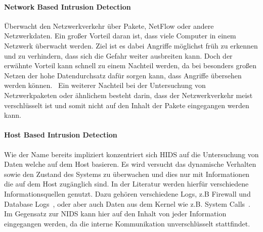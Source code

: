             \paragraph{Network Based Intrusion Detection}
                Überwacht den Netzwerkverkehr über Pakete, NetFlow oder andere Netzwerkdaten.
                Ein großer Vorteil daran ist, dass viele Computer in einem Netzwerk überwacht werden.
                Ziel ist es dabei Angriffe möglichst früh zu erkennen und zu verhindern,
                dass sich die Gefahr weiter ausbreiten kann.
                Doch der erwähnte Vorteil kann schnell zu einem Nachteil werden,
                da bei besonders großen Netzen der hohe Datendurchsatz dafür sorgen kann,
                dass Angriffe übersehen werden können.~\cite{NIDS}
                Ein weiterer Nachteil bei der Untersuchung von Netzwerkpaketen oder ähnlichem besteht darin,
                dass der Netzwerkverkehr meist verschlüsselt ist
                und somit nicht auf den Inhalt der Pakete eingegangen werden kann.

            \paragraph{Host Based Intrusion Detection}
                Wie der Name bereits impliziert konzentriert sich HIDS auf die Untersuchung 
                von Daten welche auf dem Host basieren.
                Es wird versucht das dynamische Verhalten sowie den Zustand des Systems zu überwachen 
                und dies nur mit Informationen die auf dem Host zugänglich sind.
                In der Literatur werden hierfür verschiedene Informationsquellen genutzt.
                Dazu gehören verschiedene Logs, z.B Firewall und Database Logs~\cite{IDSsurvey},
                oder aber auch Daten aus dem Kernel wie z.B. System Calls~\cite{MAGGI}.
                Im Gegensatz zur NIDS kann hier auf den Inhalt von jeder Information eingegangen werden,
                da die interne Kommunikation unverschlüsselt stattfindet. 

